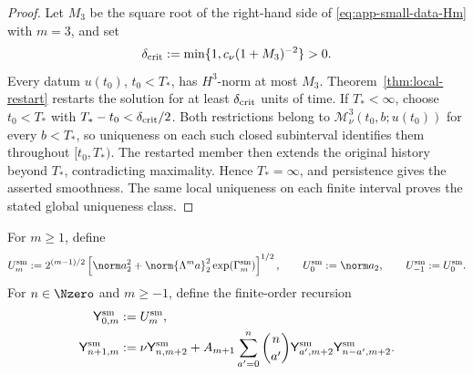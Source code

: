 \begin{proof}
Let \(M_3\) be the square root of the right-hand side of
\eqref{eq:app-small-data-Hm} with \(m=3\), and set
\[
 \delta_{\rm crit}
 :=\min\{1,c_\nu(1+M_3)^{-2}\}>0.
\]
Every datum \(u(t_0)\), \(t_0<T_*\), has \(H^3\)-norm at most \(M_3\).
Theorem~\ref{thm:local-restart} restarts the solution for at least
\(\delta_{\rm crit}\) units of time.  If \(T_*<\infty\), choose
\(t_0<T_*\) with \(T_*-t_0<\delta_{\rm crit}/2\).  Both restrictions belong
to \(\mathscr M_\nu^3(t_0,b;u(t_0))\) for every \(b<T_*\), so uniqueness on
each such closed subinterval identifies them throughout \([t_0,T_*)\).
The restarted member then extends the original history beyond \(T_*\),
contradicting maximality.  Hence \(T_*=\infty\), and persistence
 gives the asserted smoothness.  The same local uniqueness on each finite
 interval proves the stated global uniqueness class.
\end{proof}

For \(m\ge1\), define
\[
 U_m^{\rm sm}
 :=
 2^{(m-1)/2}
 \left[
 \norm a_2^2+
 \norm{\Lambda^ma}_2^2\exp(\Gamma_m^{\rm sm})
 \right]^{1/2},
 \qquad
 U_0^{\rm sm}:=\norm a_2,
 \qquad
 U_{-1}^{\rm sm}:=U_0^{\rm sm}.
\]
For \(n\in\Nzero\) and \(m\ge-1\), define the finite-order recursion
\begin{align}
 \mathsf Y_{0,m}^{\rm sm}&:=U_m^{\rm sm},
 \label{eq:app-small-Y0}\\
 \mathsf Y_{n+1,m}^{\rm sm}
 &:=
 \nu\mathsf Y_{n,m+2}^{\rm sm}
 +A_{m+1}\sum_{a'=0}^{n}\binom n{a'}
 \mathsf Y_{a',m+2}^{\rm sm}
 \mathsf Y_{n-a',m+2}^{\rm sm}.
 \label{eq:app-small-Yrec}
\end{align}

